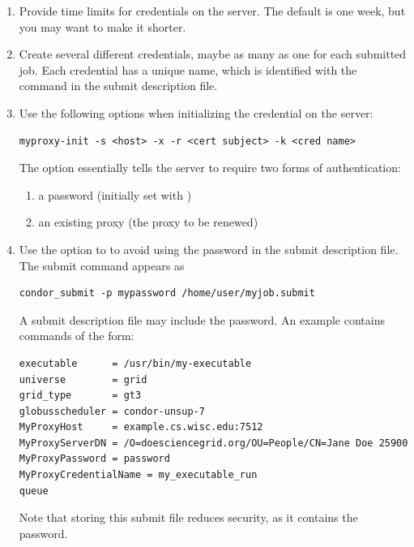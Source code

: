 \begin{enumerate}

\item{Provide time limits}
for credentials on the  server.
The default is one week, but you may want to make it shorter.

\item{Create several different  credentials},
maybe as many as one for each submitted job.
Each credential has a unique name,
which is identified with the
 command in the submit description file.

\item{Use the following options}
when initializing the credential on the  server:

\footnotesize
\begin{verbatim}
myproxy-init -s <host> -x -r <cert subject> -k <cred name>
\end{verbatim}
\normalsize

The option 
essentially tells the  server to require two forms
of authentication:
  \begin{enumerate}
  \item{a password (initially set with )}
  \item{an existing proxy (the proxy to be renewed)}
  \end{enumerate}

\item{Use the  option to }
to avoid using the password in the submit description file.
The submit command appears as
\footnotesize
\begin{verbatim}
condor_submit -p mypassword /home/user/myjob.submit
\end{verbatim}
\normalsize

A submit description file may include the password.
An example contains commands of the form:
\footnotesize
\begin{verbatim}
executable      = /usr/bin/my-executable
universe        = grid
grid_type       = gt3
globusscheduler = condor-unsup-7
MyProxyHost     = example.cs.wisc.edu:7512
MyProxyServerDN = /O=doesciencegrid.org/OU=People/CN=Jane Doe 25900
MyProxyPassword = password
MyProxyCredentialName = my_executable_run
queue
\end{verbatim}
\normalsize
Note that storing this submit file reduces security, as it
contains the password.

\end{enumerate}

